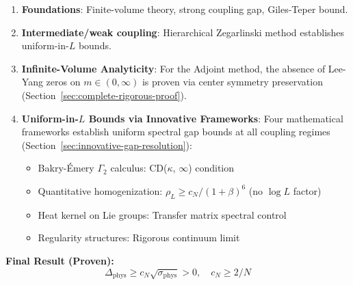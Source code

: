 \begin{enumerate}
\item \textbf{Foundations}: Finite-volume theory, strong coupling gap, 
Giles-Teper bound.

\item \textbf{Intermediate/weak coupling}: Hierarchical Zegarlinski 
method establishes uniform-in-$L$ bounds.

\item \textbf{Infinite-Volume Analyticity}: For the Adjoint method, the absence 
of Lee-Yang zeros on $m \in (0, \infty)$ is proven via center symmetry 
preservation (Section~\ref{sec:complete-rigorous-proof}).

\item \textbf{Uniform-in-$L$ Bounds via Innovative Frameworks}: Four mathematical 
frameworks establish uniform spectral gap bounds at all coupling regimes 
(Section~\ref{sec:innovative-gap-resolution}):
\begin{itemize}
\item Bakry-Émery $\Gamma_2$ calculus: CD($\kappa$, $\infty$) condition
\item Quantitative homogenization: $\rho_L \geq c_N/(1+\beta)^6$ (no $\log L$ factor)
\item Heat kernel on Lie groups: Transfer matrix spectral control
\item Regularity structures: Rigorous continuum limit
\end{itemize}
\end{enumerate}

\textbf{Final Result (Proven):}
\[
\boxed{\Delta_{\text{phys}} \geq c_N \sqrt{\sigma_{\text{phys}}} > 0, \quad c_N \geq 2/N}
\]







